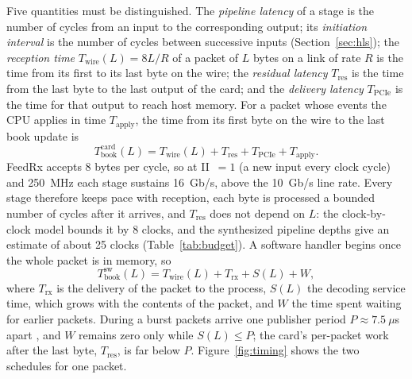 \documentclass[11pt]{article}
\begin{document}
Five quantities must be distinguished. The \emph{pipeline latency} of a stage
is the number of cycles from an input to the corresponding output; its
\emph{initiation interval} is the number of cycles between successive inputs
(Section~\ref{sec:hls}); the \emph{reception time} $T_{\mathrm{wire}}(L) =
8L/R$ of a packet of $L$ bytes on a link of rate $R$ is the time from its first
to its last byte on the wire; the \emph{residual latency} $T_{\mathrm{res}}$ is
the time from the last byte to the last output of the card; and the
\emph{delivery latency} $T_{\mathrm{PCIe}}$ is the time for that output to reach
host memory. For a packet whose events the CPU applies in time
$T_{\mathrm{apply}}$, the time from its first byte on the wire to the last
book update is
\[
T_{\mathrm{book}}^{\mathrm{card}}(L) = T_{\mathrm{wire}}(L) + T_{\mathrm{res}} +
T_{\mathrm{PCIe}} + T_{\mathrm{apply}}.
\]
FeedRx accepts 8 bytes per cycle, so at II~$=1$ (a new input every clock cycle)
and 250~MHz each stage sustains 16~Gb/s, above the 10~Gb/s line rate. Every
stage therefore keeps pace with reception, each byte is processed a bounded
number of cycles after it arrives, and $T_{\mathrm{res}}$ does not depend on
$L$: the clock-by-clock model bounds it by 8 clocks, and the synthesized
pipeline depths give an estimate of about 25 clocks (Table~\ref{tab:budget}).
A software handler begins once the whole packet is in memory, so
\[
T_{\mathrm{book}}^{\mathrm{sw}}(L) = T_{\mathrm{wire}}(L) + T_{\mathrm{rx}} +
S(L) + W,
\]
where $T_{\mathrm{rx}}$ is the delivery of the packet to the process, $S(L)$ the
decoding service time, which grows with the contents of the packet, and $W$
the time spent waiting for earlier packets. During a burst packets arrive one
publisher period $P \approx 7.5~\mu$s apart \cite{mdarrival}, and $W$ remains
zero only while $S(L) \leq P$; the card's per-packet work after the last byte,
$T_{\mathrm{res}}$, is far below $P$. Figure~\ref{fig:timing} shows the two
schedules for one packet.
\end{document}
